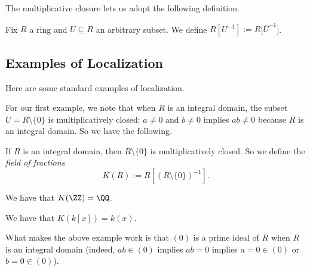 \documentclass[../notes.tex]{subfiles}
\begin{document}
The multiplicative closure lets us adopt the following definition.
\begin{definition}
	Fix $R$ a ring and $U\subseteq R$ an arbitrary subset. We define $R\left[U^{-1}\right]:=R\big[\overline U^{-1}\big]$.
\end{definition}

\subsection{Examples of Localization}
Here are some standard examples of localization.

For our first example, we note that when $R$ is an integral domain, the subset $U=R\setminus\{0\}$ is multiplicatively closed: $a\ne0$ and $b\ne0$ implies $ab\ne0$ because $R$ is an integral domain. So we have the following.
\begin{definition}
	If $R$ is an integral domain, then $R\setminus\{0\}$ is multiplicatively closed. So we define the \textit{field of fractions}
	\[K(R):=R\left[(R\setminus\{0\})^{-1}\right].\]
\end{definition}
\begin{example}
	We have that $K(\ZZ)=\QQ$.
\end{example}
\begin{example}
	We have that $K(k[x])=k(x)$.
\end{example}
What makes the above example work is that $(0)$ is a prime ideal of $R$ when $R$ is an integral domain (indeed, $ab\in(0)$ implies $ab=0$ implies $a=0\in(0)$ or $b=0\in(0)$).
\end{document}
